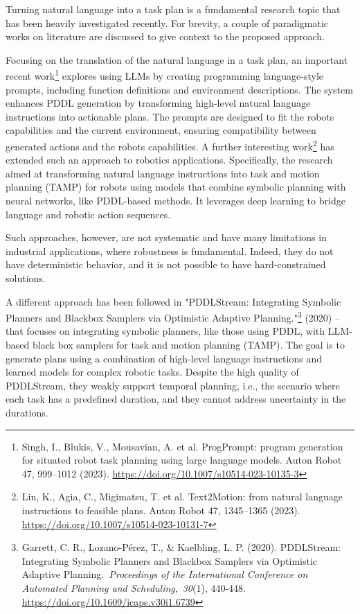 Turning natural language into a task plan is a fundamental research
topic that has been heavily investigated recently. For brevity, a couple
of paradigmatic works on literature are discussed to give context to the
proposed approach.

Focusing on the translation of the natural language in a task plan, an
important recent work\footnote{Singh, I., Blukis, V., Mousavian, A. et
  al. ProgPrompt: program generation for situated robot task planning
  using large language models. Auton Robot 47, 999--1012 (2023).
  \url{https://doi.org/10.1007/s10514-023-10135-3}} explores using LLMs
by creating programming language-style prompts, including function
definitions and environment descriptions. The system enhances PDDL
generation by transforming high-level natural language instructions into
actionable plans. The prompts are designed to fit the
robot\textquotesingle s capabilities and the current environment,
ensuring compatibility between generated actions and the
robot\textquotesingle s capabilities. A further interesting
work\footnote{Lin, K., Agia, C., Migimatsu, T. et al. Text2Motion: from
  natural language instructions to feasible plans. Auton Robot 47,
  1345--1365 (2023). \url{https://doi.org/10.1007/s10514-023-10131-7}} has
extended such an approach to robotics applications. Specifically, the
research aimed at transforming natural language instructions into task
and motion planning (TAMP) for robots using models that combine symbolic
planning with neural networks, like PDDL-based methods. It leverages
deep learning to bridge language and robotic action sequences.

Such approaches, however, are not systematic and have many limitations
in industrial applications, where robustness is fundamental. Indeed,
they do not have deterministic behavior, and it is not possible to have
hard-constrained solutions.

A different approach has been followed in "PDDLStream: Integrating
Symbolic Planners and Blackbox Samplers via Optimistic Adaptive
Planning."\footnote{Garrett, C. R., Lozano-Pérez, T., \& Kaelbling, L.
  P. (2020). PDDLStream: Integrating Symbolic Planners and Blackbox
  Samplers via Optimistic Adaptive Planning.~\emph{Proceedings of the
  International Conference on Automated Planning and
  Scheduling},~\emph{30}(1), 440-448.
  \url{https://doi.org/10.1609/icaps.v30i1.6739}} (2020) -- that focuses on
integrating symbolic planners, like those using PDDL, with LLM-based
black box samplers for task and motion planning (TAMP). The goal is to
generate plans using a combination of high-level language instructions
and learned models for complex robotic tasks. Despite the high quality
of PDDLStream, they weakly support temporal planning, i.e., the scenario
where each task has a predefined duration, and they cannot address
uncertainty in the durations.

